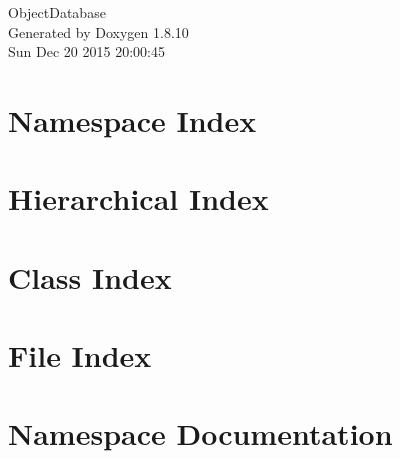 \documentclass[twoside]{book}
\newcommand{\+}{\discretionary{\mbox{\scriptsize$\hookleftarrow$}}{}{}}
\newcommand{\clearemptydoublepage}{%
  \newpage{\pagestyle{empty}\cleardoublepage}%
}
\begin{document}
\hypersetup{pageanchor=false,
             bookmarks=true,
             bookmarksnumbered=true,
             pdfencoding=unicode
            }
\begin{titlepage}
\vspace*{7cm}
\begin{center}%
{\Large Object\+Database }\\
\vspace*{1cm}
{\large Generated by Doxygen 1.8.10}\\
\vspace*{0.5cm}
{\small Sun Dec 20 2015 20:00:45}\\
\end{center}
\end{titlepage}
\clearemptydoublepage
\tableofcontents
\clearemptydoublepage
{}
\hypersetup{pageanchor=true}

\chapter{Namespace Index}

\chapter{Hierarchical Index}

\chapter{Class Index}

\chapter{File Index}

\chapter{Namespace Documentation}



\end{document}
